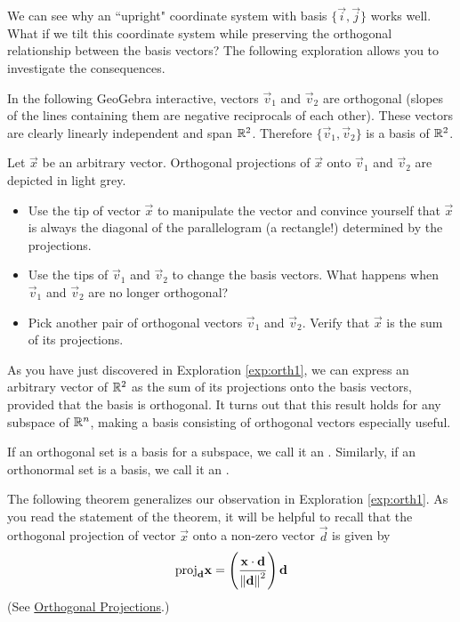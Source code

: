 \documentclass{ximera}
\begin{document}
We can see why an ``upright" coordinate system with basis $\{\vec{i},\vec{j}\}$ works well.  What if we tilt this coordinate system while preserving the orthogonal relationship between the basis vectors?  The following exploration allows you to investigate the consequences.

\begin{exploration}\label{exp:orth1}
    In the following GeoGebra interactive, vectors $\vec{v}_1$ and $\vec{v}_2$ are orthogonal (slopes of the lines containing them are negative reciprocals of each other).  These vectors are clearly linearly independent and span $\mathbb{R}^2$.  Therefore $\{\vec{v}_1,\vec{v}_2\}$ is a basis of $\mathbb{R}^2$.  
    
    Let $\vec{x}$ be an arbitrary vector.  Orthogonal projections of $\vec{x}$ onto $\vec{v}_1$ and $\vec{v}_2$ are depicted in light grey.
    \begin{itemize}
           \item Use the tip of vector $\vec{x}$ to manipulate the vector and convince yourself that $\vec{x}$ is always the diagonal of the parallelogram (a rectangle!) determined by the projections.
        \item Use the tips of $\vec{v}_1$ and $\vec{v}_2$ to change the basis vectors.  What happens when $\vec{v}_1$ and $\vec{v}_2$ are no longer orthogonal?
        \item Pick another pair of orthogonal vectors $\vec{v}_1$ and $\vec{v}_2$.  Verify that $\vec{x}$ is the sum of its projections.
    \end{itemize}

    \begin{center}
\end{center}
\end{exploration}


As you have just discovered in Exploration \ref{exp:orth1}, we can express an arbitrary vector of $\mathbb{R}^2$ as the sum of its projections onto the basis vectors, provided that the basis is orthogonal. It turns out that this result holds for any subspace of $\mathbb{R}^n$, making a basis consisting of orthogonal vectors especially useful. 

If an orthogonal set is a basis for a subspace, we call it an
. Similarly, if an orthonormal set is a basis, we call it an .


The following theorem generalizes our observation in Exploration \ref{exp:orth1}.  As you read the statement of the theorem, it will be helpful to recall that the orthogonal projection of vector $\vec{x}$ onto a non-zero vector $\vec{d}$ is given by
\begin{equation}\label{eq:orthProj}
\mbox{proj}_{\mathbf{d}}\mathbf{x}=\left(\frac{\mathbf{x}\cdot\mathbf{d}}{\left\lVert\mathbf{d}\right\rVert^2}\right)\mathbf{d}
\end{equation}
(See \href{https://ximera.osu.edu/oerlinalg/LinearAlgebra/VEC-0070/main}{Orthogonal Projections}.)
\end{document}
